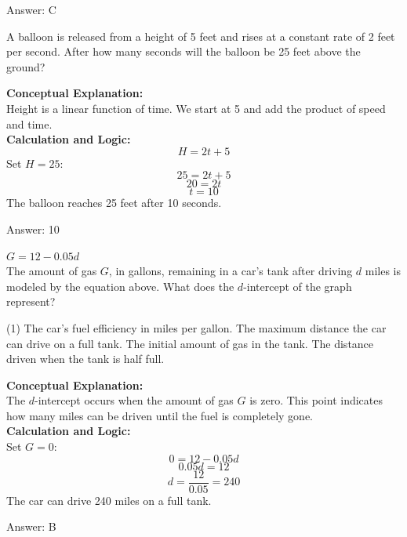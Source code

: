 \documentclass[11pt,paper=a4,answers]{exam}
\begin{document}
\begin{questions}
\begin{solution}
\vspace{15pt}
Answer: \colorbox{yellow!100}{C}
\end{solution}

\question
A balloon is released from a height of 5 feet and rises at a constant rate of 2 feet per second. After how many seconds will the balloon be 25 feet above the ground?

\begin{solution}
\textbf{Conceptual Explanation:} \\
Height is a linear function of time. We start at 5 and add the product of speed and time.
\\[10pt]
\textbf{Calculation and Logic:} \\
\[H = 2t + 5\]
Set $H = 25$:
\[25 = 2t + 5\]
\[20 = 2t\]
\[t = 10\]
The balloon reaches 25 feet after 10 seconds.

\vspace{15pt}
Answer: \colorbox{yellow!100}{10}
\end{solution}

\question
$G = 12 - 0.05d$ \\
The amount of gas $G$, in gallons, remaining in a car's tank after driving $d$ miles is modeled by the equation above. What does the $d$-intercept of the graph represent?
\begin{tasks}(1)
    \task The car's fuel efficiency in miles per gallon.
    \task The maximum distance the car can drive on a full tank.
    \task The initial amount of gas in the tank.
    \task The distance driven when the tank is half full.
\end{tasks}

\begin{solution}
\textbf{Conceptual Explanation:} \\
The $d$-intercept occurs when the amount of gas $G$ is zero. This point indicates how many miles can be driven until the fuel is completely gone.
\\[10pt]
\textbf{Calculation and Logic:} \\
Set $G = 0$:
\[0 = 12 - 0.05d\]
\[0.05d = 12\]
\[d = \frac{12}{0.05} = 240\]
The car can drive 240 miles on a full tank.

\vspace{15pt}
Answer: \colorbox{yellow!100}{B}
\end{solution}


\end{questions}
\end{document}
